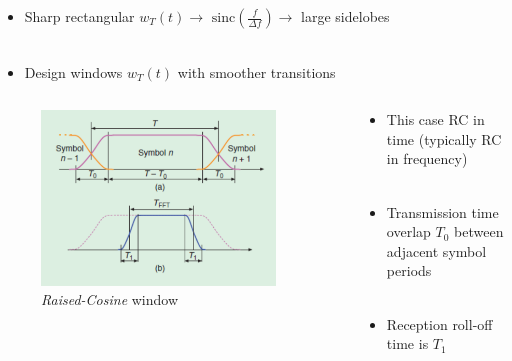\documentclass[xcolor=dvipsnames,aspectratio=169]{beamer}
\begin{document}
{\begin{itemize}
\item Sharp rectangular $w_T(t)\to$ $\mathrm{sinc}(\frac{f}{\Delta f})\to$ large sidelobes\\ \ \\
\item Design windows $w_T(t)$ with smoother transitions
\end{itemize}
\begin{columns}
 \begin{column}{6cm}
\begin{figure}
 \centering
 \caption{\textit{Raised-Cosine} window}
 \includegraphics[width=0.9\textwidth]{rcresponse.png} 
\end{figure}
 \end{column}
 \begin{column}{6cm}
    \begin{itemize}
    \item This case RC in time (typically RC in frequency)\\ \ \\
    \item Transmission time overlap $T_0$ between adjacent symbol periods \\ \ \\
    \item Reception roll-off time is $T_1$
\end{itemize}
 \end{column}
\end{columns}


}
\end{document}

